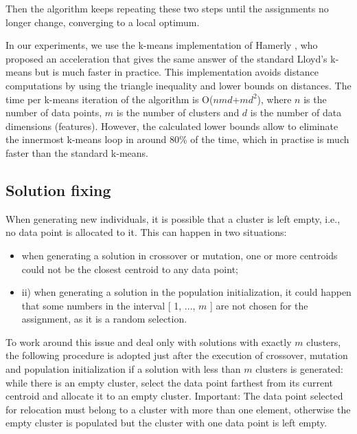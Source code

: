 Then the algorithm keeps repeating these two steps until the assignments no longer change, converging to a local optimum.

In our experiments, we use the k-means implementation of Hamerly \cite{Hamerly2010}, who proposed an acceleration that gives the same answer of the standard Lloyd's k-means \cite{Lloyd1982} but is much faster in practice. This implementation avoids distance computations by using the triangle inequality and lower bounds on distances. The time per k-means iteration of the algorithm is O($nmd$+$md^2$), where $n$ is the number of data points, $m$ is the number of clusters and $d$ is the number of data dimensions (features). However, the calculated lower bounds allow to eliminate the innermost k-means loop in around 80\% of the time, which in practise is much faster than the standard k-means.

\subsection{Solution fixing}
When generating new individuals, it is possible that a cluster is left empty, i.e., no data point is allocated to it. This can happen in two situations: 

\begin{itemize}
	
	\item when generating a solution in crossover or mutation, one or more centroids could not be the closest centroid to any data point;

	\item ii) when generating a solution in the population initialization, it could happen that some numbers in the interval [ 1, ..., $m$ ] are not chosen for the assignment, as it is a random selection.
	
\end{itemize}

To work around this issue and deal only with solutions with exactly $m$ clusters, the following procedure is adopted just after the execution of crossover, mutation and population initialization if a solution with less than $m$ clusters is generated: while there is an empty cluster, select the data point farthest from its current centroid and allocate it to an empty cluster. Important: The data point selected for relocation must belong to a cluster with more than one element, otherwise the empty cluster is populated but the cluster with one data point is left empty.

